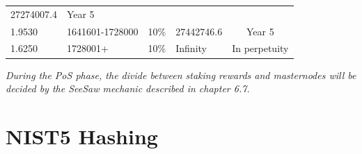 \documentclass[11pt,a4paperpaper,]{report}
\begin{document}
\begin{longtable}[]{@{}llllc@{}}
\begin{minipage}[t]{0.19\columnwidth}
27274007.4\strut
\end{minipage} & \begin{minipage}[t]{0.16\columnwidth}\centering\strut
Year 5\strut
\end{minipage}\tabularnewline
\begin{minipage}[t]{0.12\columnwidth}\raggedright\strut
1.9530\strut
\end{minipage} & \begin{minipage}[t]{0.23\columnwidth}\raggedright\strut
1641601-1728000\strut
\end{minipage} & \begin{minipage}[t]{0.14\columnwidth}\raggedright\strut
10\%\strut
\end{minipage} & \begin{minipage}[t]{0.19\columnwidth}\raggedright\strut
27442746.6\strut
\end{minipage} & \begin{minipage}[t]{0.16\columnwidth}\centering\strut
Year 5\strut
\end{minipage}\tabularnewline
\begin{minipage}[t]{0.12\columnwidth}\raggedright\strut
1.6250\strut
\end{minipage} & \begin{minipage}[t]{0.23\columnwidth}\raggedright\strut
1728001+\strut
\end{minipage} & \begin{minipage}[t]{0.14\columnwidth}\raggedright\strut
10\%\strut
\end{minipage} & \begin{minipage}[t]{0.19\columnwidth}\raggedright\strut
Infinity\strut
\end{minipage} & \begin{minipage}[t]{0.16\columnwidth}\centering\strut
In perpetuity\strut
\end{minipage}\tabularnewline
\bottomrule
\end{longtable}

\textit{During the PoS phase, the divide between staking rewards and masternodes will be decided by the SeeSaw mechanic described in chapter 6.7.}

\newpage


\chapter{NIST5 Hashing}\label{nist5-hashing}
\end{document}
